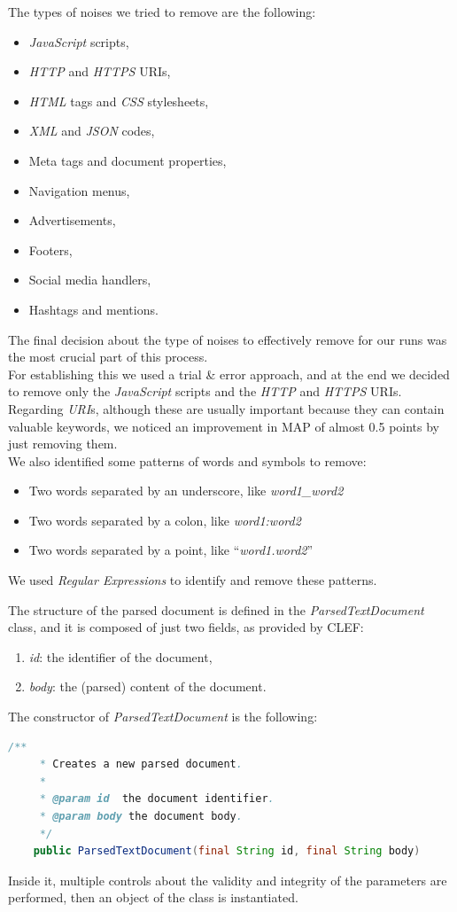 The types of noises we tried to remove are the following:
\begin{itemize}
\item \textit{JavaScript} scripts,
\item \textit{HTTP} and \textit{HTTPS} URIs,
\item \textit{HTML} tags and \textit{CSS} stylesheets,
\item \textit{XML} and \textit{JSON} codes,
\item Meta tags and document properties,
\item Navigation menus,
\item Advertisements,
\item Footers,
\item Social media handlers,
\item Hashtags and mentions.
\end{itemize}
The final decision about the type of noises to effectively remove for our runs was the most crucial part of this process. \\
For establishing this we used a trial \& error approach, and at the end we decided to remove only the \textit{JavaScript} scripts and the \textit{HTTP} and \textit{HTTPS} URIs. Regarding \textit{URI}s, although these are usually important because they can contain valuable keywords, we noticed an improvement in \ac{MAP} of almost 0.5 points by just removing them. \\
We also identified some patterns of words and symbols to remove:
\begin{itemize}
\item Two words separated by an underscore, like \textit{word1\_word2}
\item Two words separated by a colon, like \textit{word1:word2}
\item Two words separated by a point, like ``\textit{word1.word2}''
\end{itemize}
We used \textit{Regular Expressions} \cite{regexdefinition} to identify and remove these patterns.  

The structure of the parsed document is defined in the \textit{ParsedTextDocument} class, and it is composed of just two fields, as provided by \ac{CLEF}:
\begin{enumerate}
\item \textit{id}: the identifier of the document,
\item \textit{body}: the (parsed) content of the document.
\end{enumerate}
The constructor of \textit{ParsedTextDocument} is the following:
\begin{lstlisting}[language=Java]
    /**
     * Creates a new parsed document.
     *
     * @param id  the document identifier.
     * @param body the document body.
     */
    public ParsedTextDocument(final String id, final String body) 
\end{lstlisting}
Inside it, multiple controls about the validity and integrity of the parameters are performed, then an object of the class is instantiated. 



